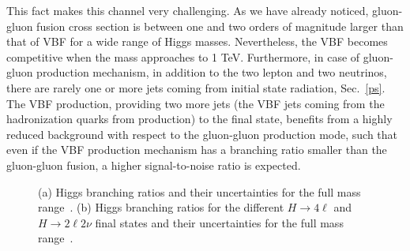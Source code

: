  This fact makes this channel very challenging. 
As we have already noticed, gluon-gluon fusion cross section  is between one
and two orders of magnitude larger than that of VBF for a wide range of Higgs masses.
Nevertheless, the VBF becomes competitive when the mass approaches to 1 TeV. 
Furthermore, in case of gluon-gluon production mechanism, in addition to the two lepton and two neutrinos, there are rarely one or more jets coming from initial state radiation, Sec.~\ref{ps}. 
The VBF production, providing two more jets (the VBF jets coming from the hadronization quarks from production) to the final
state, benefits from a highly reduced background with respect to the gluon-gluon production mode,
such that even if the VBF production mechanism has a branching ratio smaller than the
gluon-gluon fusion, a higher signal-to-noise ratio is expected.
\begin{figure}
\centering%
\caption{(a) Higgs branching ratios and their uncertainties for the full mass range~\cite{Denner:2011mq}. (b) Higgs branching ratios for the different $H \to 4 \ell$ and $H \to 2\ell 2\nu $ final states and their uncertainties for the full mass range~\cite{Denner:2011mq}.}
\label{br}
\end{figure}



